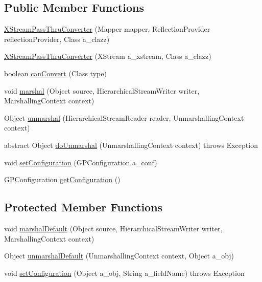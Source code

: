 \subsection*{Public Member Functions}
\begin{DoxyCompactItemize}
\item 
\hyperlink{classorg_1_1jgap_1_1util_1_1_x_stream_pass_thru_converter_a21ee385b3d8eae875cae8021c4f662ad}{X\-Stream\-Pass\-Thru\-Converter} (Mapper mapper, Reflection\-Provider reflection\-Provider, Class a\-\_\-clazz)
\item 
\hyperlink{classorg_1_1jgap_1_1util_1_1_x_stream_pass_thru_converter_ac851819015873b58b6b547550b68226a}{X\-Stream\-Pass\-Thru\-Converter} (X\-Stream a\-\_\-xstream, Class a\-\_\-clazz)
\item 
boolean \hyperlink{classorg_1_1jgap_1_1util_1_1_x_stream_pass_thru_converter_afadae00cbdbb4fdfda4deded61b719a1}{can\-Convert} (Class type)
\item 
void \hyperlink{classorg_1_1jgap_1_1util_1_1_x_stream_pass_thru_converter_ae2fc582ab278339a8e47ed910273380f}{marshal} (Object source, Hierarchical\-Stream\-Writer writer, Marshalling\-Context context)
\item 
Object \hyperlink{classorg_1_1jgap_1_1util_1_1_x_stream_pass_thru_converter_af64a26c53629c6876645b7188b256b9a}{unmarshal} (Hierarchical\-Stream\-Reader reader, Unmarshalling\-Context context)
\item 
abstract Object \hyperlink{classorg_1_1jgap_1_1util_1_1_x_stream_pass_thru_converter_ab6de1d9f9d67e5efae2a6ed3a7ee2ff3}{do\-Unmarshal} (Unmarshalling\-Context context)  throws Exception
\item 
void \hyperlink{classorg_1_1jgap_1_1util_1_1_x_stream_pass_thru_converter_ac7629d59cf51f33d74d1bf36ddf609f3}{set\-Configuration} (G\-P\-Configuration a\-\_\-conf)
\item 
G\-P\-Configuration \hyperlink{classorg_1_1jgap_1_1util_1_1_x_stream_pass_thru_converter_ac47ce7d0582cbef01efacfcfccfd5ae5}{get\-Configuration} ()
\end{DoxyCompactItemize}
\subsection*{Protected Member Functions}
\begin{DoxyCompactItemize}
\item 
void \hyperlink{classorg_1_1jgap_1_1util_1_1_x_stream_pass_thru_converter_af8497b8893e2d6519f89ba4fbbeab666}{marshal\-Default} (Object source, Hierarchical\-Stream\-Writer writer, Marshalling\-Context context)
\item 
Object \hyperlink{classorg_1_1jgap_1_1util_1_1_x_stream_pass_thru_converter_a2552885f070e0d2cb06a2b5aafd4126e}{unmarshal\-Default} (Unmarshalling\-Context context, Object a\-\_\-obj)
\item 
void \hyperlink{classorg_1_1jgap_1_1util_1_1_x_stream_pass_thru_converter_a6eabbdf4a4d3e31cadd3bcbc9e0fec93}{set\-Configuration} (Object a\-\_\-obj, String a\-\_\-field\-Name)  throws Exception 
\end{DoxyCompactItemize}

